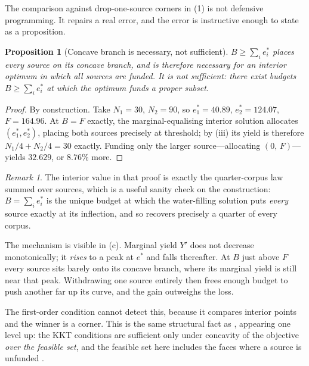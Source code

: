 \documentclass[11pt,twocolumn,a4paper]{article}
\theoremstyle{thmstyle}
\newtheorem{proposition}[theorem]{Proposition}
\theoremstyle{definition}
\theoremstyle{remark}
\newtheorem{remark}[theorem]{Remark}
\newcommand{\estar}{e^{*}}
\newcommand{\yield}{Y}
\begin{document}
The comparison against drop-one-source corners in
(1) is not defensive programming. It repairs a real
error, and the error is instructive enough to state as a proposition.

\begin{proposition}[Concave branch is necessary, not sufficient]
\label{prop:notsufficient}
$B\ge\sum_i\estar_i$ places every source on its concave branch, and is
therefore necessary for an interior optimum in which all sources are
funded. It is not sufficient: there exist budgets $B\ge\sum_i\estar_i$
at which the optimum funds a proper subset.
\end{proposition}

\begin{proof}
By construction. Take $N_1=30$, $N_2=90$, so $\estar_1=40.89$,
$\estar_2=124.07$, $F=164.96$. At $B=F$ exactly, the marginal-equalising
interior solution allocates $(\estar_1,\estar_2)$, placing both sources
precisely at threshold; by (iii) its yield is
therefore $N_1/4+N_2/4=30$ exactly. Funding only the larger
source---allocating $(0,\,F)$---yields $32.629$, or $8.76\%$ more.
\end{proof}

\begin{remark}
The interior value in that proof is exactly the quarter-corpus law
summed over sources, which is a useful sanity check on the construction:
$B=\sum_i\estar_i$ is the unique budget at which the water-filling
solution puts \emph{every} source exactly at its inflection, and so
recovers precisely a quarter of every corpus.
\end{remark}

The mechanism is visible in (c). Marginal yield
$\yield'$ does not decrease monotonically; it \emph{rises} to a peak at
$\estar$ and falls thereafter. At $B$ just above $F$ every source sits
barely onto its concave branch, where its marginal yield is still near
that peak. Withdrawing one source entirely then frees enough budget to
push another far up its curve, and the gain outweighs the loss.

The first-order condition cannot detect this, because it compares
interior points and the winner is a corner. This is the same structural
fact as , appearing one level up: the KKT conditions
are sufficient only under concavity of the objective \emph{over the
feasible set}, and the feasible set here includes the faces where a
source is unfunded \citep{boyd2004convex}.
\end{document}
